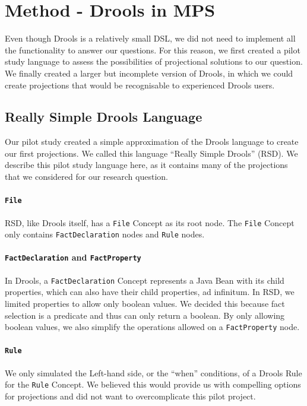 \section{Method - Drools in MPS}
\label{section:dsr_method}

Even though Drools is a relatively small DSL, we did not need to implement all the functionality to answer our questions.
For this reason, we first created a pilot study language to assess the possibilities of projectional solutions to our question.
We finally created a larger but incomplete version of Drools, in which we could create projections that would be recognisable to experienced Drools users.

\subsection{Really Simple Drools Language}
Our pilot study created a simple approximation of the Drools language to create our first projections. 
We called this language ``Really Simple Drools'' (RSD).
We describe this pilot study language here, as it contains many of the projections that we considered for our research question.

\paragraph{\texttt{File}} RSD, like Drools itself, has a \texttt{File} Concept as its root node.
The \texttt{File} Concept only contains \texttt{FactDeclaration} nodes and \texttt{Rule} nodes.

\paragraph{\texttt{FactDeclaration} and \texttt{FactProperty}} In Drools, a \texttt{FactDeclaration} Concept represents a Java Bean with its child properties, which can also have their child properties, ad infinitum.
In RSD, we limited properties to allow only boolean values.
We decided this because fact selection is a predicate and thus can only return a boolean.
By only allowing boolean values, we also simplify the operations allowed on a \texttt{FactProperty} node.

\paragraph{\texttt{Rule}} We only simulated the Left-hand side, or the ``when'' conditions, of a Drools Rule for the \texttt{Rule} Concept.
We believed this would provide us with compelling options for projections and did not want to overcomplicate this pilot project.

